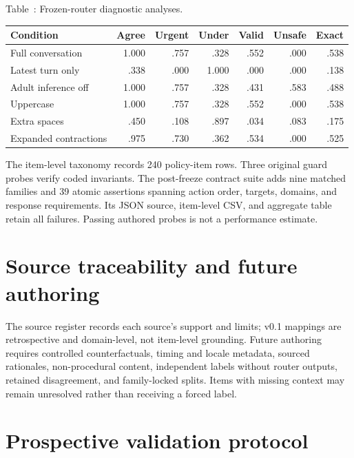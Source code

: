 \documentclass{article}
\newenvironment{fixedtable}{\par\medskip\refstepcounter{table}}{\par\medskip}
\newcommand{\fixedcaption}[1]{\noindent Table~\thetable: #1\par\smallskip}
\begin{document}
\begin{fixedtable}
  \fixedcaption{Frozen-router diagnostic analyses.}
  \label{tab:diagnostics}
  \centering
  \scriptsize
  \begin{tabular}{lrrrrrr}
    \toprule
    Condition & Agree & Urgent & Under & Valid & Unsafe & Exact \\
    \midrule
    Full conversation & 1.000 & .757 & .328 & .552 & .000 & .538 \\
    Latest turn only & .338 & .000 & 1.000 & .000 & .000 & .138 \\
    Adult inference off & 1.000 & .757 & .328 & .431 & .583 & .488 \\
    Uppercase & 1.000 & .757 & .328 & .552 & .000 & .538 \\
    Extra spaces & .450 & .108 & .897 & .034 & .083 & .175 \\
    Expanded contractions & .975 & .730 & .362 & .534 & .000 & .525 \\
    \bottomrule
  \end{tabular}
\end{fixedtable}

The item-level taxonomy records 240 policy-item rows. Three original guard probes verify coded invariants. The post-freeze contract suite adds nine matched families and 39 atomic assertions spanning action order, targets, domains, and response requirements. Its JSON source, item-level CSV, and aggregate table retain all failures. Passing authored probes is not a performance estimate.

\section{Source traceability and future authoring}

The source register records each source's support and limits; v0.1 mappings are retrospective and domain-level, not item-level grounding. Future authoring requires controlled counterfactuals, timing and locale metadata, sourced rationales, non-procedural content, independent labels without router outputs, retained disagreement, and family-locked splits. Items with missing context may remain unresolved rather than receiving a forced label.

\section{Prospective validation protocol}
\end{document}
